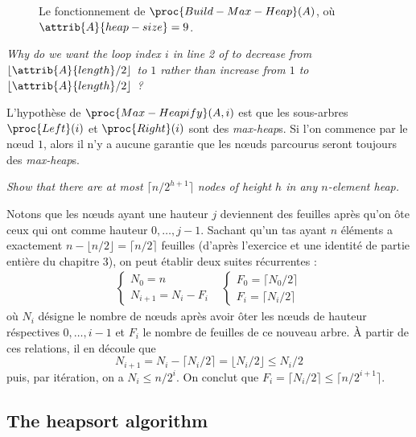 \begin{description}
\begin{ex}
\begin{figure}[H]
        \caption{Le fonctionnement de $\proc{Build-Max-Heap}(A)$, o\`u $\attrib{A}{heap-size}= 9$.} 
        \label{fig:Build-Max-Heap}
      \end{figure}
    \end{ex}
     \textit{Why do we want the loop index $i$ in line 2 of  to decrease from
$\lfloor \attrib{A}{length}/2 \rfloor$ to $1$ rather than increase from $1$ to $\lfloor \attrib{A}{length}/2 \rfloor$ ?}
    \begin{ex}
	  L'hypoth\`ese de $\proc{Max-Heapify}(A,i)$ est que les sous-arbres $\proc{Left}(i)$ et $\proc{Right}(i)$ sont des \textit{max-heap}s. Si l'on commence par le n\oe ud $1$, alors il n'y a aucune garantie que les n\oe uds parcourus seront toujours des \textit{max-heap}s.
    \end{ex}
     \textit{Show that there are at most $\lceil n/2^{h+1}\rceil$ nodes of height $h$ in any $n$-element heap.}
    \begin{ex} %
      Notons que les n\oe uds ayant une hauteur $j$ deviennent des feuilles apr\`es qu'on \^ote ceux qui ont comme hauteur $0, \ldots, j-1$. Sachant qu'un tas ayant $n$ \'el\'ements a exactement $n - \lfloor n/2 \rfloor = \lceil n/2 \rceil$ feuilles (d'apr\`es l'exercice  et une identit\'e de partie enti\`ere du chapitre 3), on peut \'etablir deux suites r\'ecurrentes :
\[
\begin{matrix}
\left\{
	\begin{array}{ll}
	N_0 = n\\
	N_{i+1} = N_i - F_i
	\end{array}
\right.  &
\left\{
	\begin{array}{ll}
	F_0 = \lceil N_0/2 \rceil\\
	F_i = \lceil N_i/2 \rceil
	\end{array}
  \right. 
\end{matrix}
\]
o\`u $N_i$ d\'esigne le nombre de n\oe uds apr\`es avoir \^oter les n\oe uds de hauteur r\'espectives $0, \ldots, i-1$ et $F_i$ le nombre de feuilles de ce nouveau arbre.
\`A partir de ces relations, il en d\'ecoule que
\[ N_{i+1} = N_i - \lceil N_i/2 \rceil = \lfloor N_i/2 \rfloor \le N_i/2 \]
puis, par it\'eration, on a $N_i \le n/2^i$. On conclut que $F_i = \lceil N_i/2 \rceil \le \lceil n/2^{i+1} \rceil$.
    \end{ex}
\end{description}

\subsection{The heapsort algorithm}

